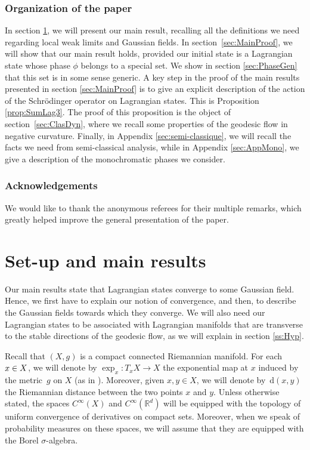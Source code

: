 \documentclass[JEP,XML,SOM,Unicode,published]{cedram}
\newcommand{\rd}{\,\mathrm{d}}
\theoremstyle{plain}
\theoremstyle{definition}
\newcommand{\R}{\mathbb{R}}
\begin{document}
\subsubsection*{Organization of the paper}
In section \ref{sec:main_results}, we will present our main result, recalling all the definitions we need regarding local weak limits and Gaussian fields. In section~\ref{sec:MainProof}, we will show that our main result holds, provided our initial state is a Lagrangian state whose phase $\phi$ belongs to a special set. We show in section \ref{sec:PhaseGen} that this set is in some sense generic. A key step in the proof of the main results presented in section \ref{sec:MainProof} is to give an explicit description of the action of the Schrödinger operator on Lagrangian states. This is Proposition \ref{prop:SumLag3}. The proof of this proposition is the object of section~\ref{sec:ClasDyn}, where we recall some properties of the geodesic flow in negative curvature.
Finally, in Appendix \ref{sec:semi-classique}, we will recall the facts we need from semi-classical analysis, while in Appendix \ref{sec:AppMono}, we give a description of the monochromatic phases we consider.

\subsubsection*{Acknowledgements}
We would like to thank the anonymous referees for their multiple remarks, which greatly helped improve the general presentation of the paper.

\section{Set-up and main results}\label{sec:main_results}
Our main results state that Lagrangian states converge to some Gaussian field. Hence, we first have to explain our notion of convergence, and then, to describe the Gaussian fields towards which they converge. We will also need our Lagrangian states to be associated with Lagrangian manifolds that are transverse to the stable directions of the geodesic flow, as we will explain in section \ref{ss:Hyp}.

Recall that $(X,g)$ is a compact connected Riemannian manifold. For each $x\in\nobreak X$, we will denote by $\exp_x:T_xX\to X$ the exponential map at $x$ induced by the metric~$g$ on $X$ (as in \cite[Def.\,1.4.3]{Jost}). Moreover, given $x,y\in X$, we will denote by $\rd (x,y)$ the Riemannian distance between the two points $x$ and $y$. Unless otherwise stated, the spaces $C^\infty(X)$ and $C^\infty(\R^d)$ will be equipped with the topology of uniform convergence of derivatives on compact sets. Moreover, when we speak of probability measures on these spaces, we will assume that they are equipped with the Borel $\sigma$-algebra.
\end{document}
